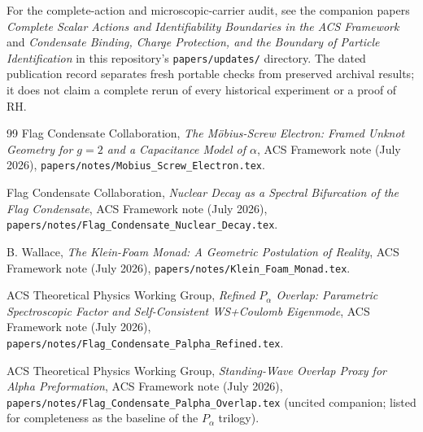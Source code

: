 \documentclass[11pt,a4paper]{article}
\theoremstyle{remark}
\theoremstyle{definition}
\begin{document}
For the complete-action and microscopic-carrier audit, see the companion
papers \emph{Complete Scalar Actions and Identifiability Boundaries in the ACS
Framework} and \emph{Condensate Binding, Charge Protection, and the Boundary
of Particle Identification} in this repository's \texttt{papers/updates/}
directory. The dated publication record separates fresh portable checks
from preserved archival results; it does not claim a complete rerun of every
historical experiment or a proof of RH.

\begin{thebibliography}{99}
Flag Condensate Collaboration,
\emph{The M\"obius-Screw Electron: Framed Unknot Geometry for $g=2$ and a Capacitance Model of $\alpha$},
ACS Framework note (July 2026),
\nolinkurl{papers/notes/Mobius_Screw_Electron.tex}.

Flag Condensate Collaboration,
\emph{Nuclear Decay as a Spectral Bifurcation of the Flag Condensate},
ACS Framework note (July 2026),
\nolinkurl{papers/notes/Flag_Condensate_Nuclear_Decay.tex}.

B. Wallace,
\emph{The Klein-Foam Monad: A Geometric Postulation of Reality},
ACS Framework note (July 2026),
\nolinkurl{papers/notes/Klein_Foam_Monad.tex}.

ACS Theoretical Physics Working Group,
\emph{Refined $P_\alpha$ Overlap: Parametric Spectroscopic Factor and Self-Consistent WS+Coulomb Eigenmode},
ACS Framework note (July 2026),
\nolinkurl{papers/notes/Flag_Condensate_Palpha_Refined.tex}.

ACS Theoretical Physics Working Group,
\emph{Standing-Wave Overlap Proxy for Alpha Preformation},
ACS Framework note (July 2026),
\nolinkurl{papers/notes/Flag_Condensate_Palpha_Overlap.tex}
(uncited companion; listed for completeness as the baseline of the
$P_\alpha$ trilogy).
\end{thebibliography}
\end{document}
